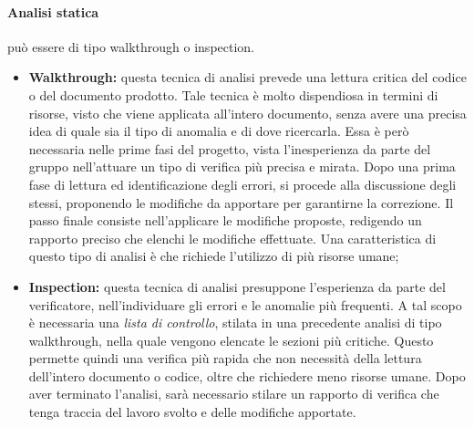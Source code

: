 \paragraph{Analisi statica} può essere di tipo walkthrough o inspection.
\begin{itemize}
 	\item \textbf{Walkthrough:} questa tecnica di analisi prevede una lettura critica del codice o del documento prodotto. Tale tecnica è molto dispendiosa in termini di risorse, visto che viene applicata all'intero documento, senza avere una precisa idea di quale sia il tipo di anomalia e di dove ricercarla. Essa è però necessaria nelle prime fasi del progetto, vista l'inesperienza da parte del gruppo nell'attuare un tipo di verifica più precisa e mirata. Dopo una prima fase di lettura ed identificazione degli errori, si procede alla discussione degli stessi, proponendo le modifiche da apportare per garantirne la correzione. Il passo finale consiste nell'applicare le modifiche proposte, redigendo un rapporto preciso che elenchi le modifiche effettuate. Una caratteristica di questo tipo di analisi è che richiede l'utilizzo di più risorse umane;
 	\item \textbf{Inspection:} questa tecnica di analisi presuppone l'esperienza da parte del verificatore, nell'individuare gli errori e le anomalie più frequenti. A tal scopo è necessaria una \textit{lista di controllo}, stilata in una precedente analisi di tipo walkthrough, nella quale vengono elencate le sezioni più critiche. Questo permette quindi una verifica più rapida che non necessità della lettura dell'intero documento o codice, oltre che richiedere meno risorse umane. Dopo aver terminato l'analisi, sarà necessario stilare un rapporto di verifica che tenga traccia del lavoro svolto e delle modifiche apportate.
\end{itemize}

